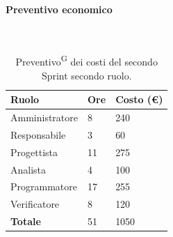 \documentclass[8pt]{article}
\newcommand{\glossterm}[1]{#1\textsuperscript{G}} %
\newcommand{\subsubsubsection}[1]{\paragraph{#1}\mbox{}\\}
\begin{document}
\subsubsubsection{Preventivo economico}
\begin{table}[ht!]
	\centering
	\begin{tabular}{p{4cm} p{1cm} p{2cm}}
        \toprule
        \textbf{Ruolo} & \textbf{Ore} & \textbf{Costo (€)} \\
        \midrule
        Amministratore & 8 & 240 \\
        Responsabile & 3 & 60 \\
        Progettista & 11 & 275 \\
        Analista & 4 & 100 \\
        Programmatore & 17 & 255 \\
        Verificatore & 8 & 120 \\
        \bottomrule
        \textbf{Totale} & 51 & 1050
    \end{tabular}
    \caption{\glossterm{Preventivo} dei costi del secondo Sprint secondo ruolo.}
	\label{table:Preventivo dei costi del secondo Sprint secondo ruolo}
\end{table}
\end{document}
